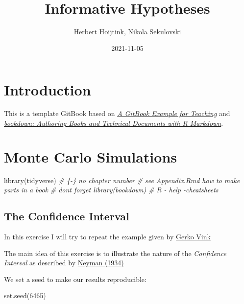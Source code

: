 \documentclass[
]{book}
\title{Informative Hypotheses}
\author{Herbert Hoijtink, Nikola Sekulovski}
\date{2021-11-05}
\newenvironment{Shaded}{\begin{snugshade}}{\end{snugshade}}
\newcommand{\CommentTok}[1]{\textcolor[rgb]{0.56,0.35,0.01}{\textit{#1}}}
\newcommand{\DecValTok}[1]{\textcolor[rgb]{0.00,0.00,0.81}{#1}}
\newcommand{\FunctionTok}[1]{\textcolor[rgb]{0.00,0.00,0.00}{#1}}
\newcommand{\NormalTok}[1]{#1}
\begin{document}
\maketitle

{
\setcounter{tocdepth}{1}
\tableofcontents
}
\hypertarget{introduction}{%
\chapter{Introduction}\label{introduction}}

This is a template GitBook based on \href{https://cjvanlissa.github.io/gitbook-demo/}{\emph{A GitBook Example for Teaching}} and \href{https://bookdown.org/yihui/bookdown/}{\emph{bookdown: Authoring Books and Technical Documents with R Markdown}}.

\hypertarget{monte-carlo-simulations}{%
\chapter{Monte Carlo Simulations}\label{monte-carlo-simulations}}

\begin{Shaded}
\begin{Highlighting}[]
\FunctionTok{library}\NormalTok{(tidyverse)}
\CommentTok{\# \{{-}\} no chapter number}
\CommentTok{\# see Appendix.Rmd how to make parts in a book}
\CommentTok{\# don\textquotesingle{}t forget library(bookdown)}
\CommentTok{\# R {-} help {-}cheatsheets}
\end{Highlighting}
\end{Shaded}

\hypertarget{the-confidence-interval}{%
\section{The Confidence Interval}\label{the-confidence-interval}}

In this exercise I will try to repeat the example given by \href{https://www.gerkovink.com/markup/Wk1/Solution_to_Ex1.html}{Gerko Vink}

The main idea of this exercise is to illustrate the nature of the \emph{Confidence Interval} as described by \href{http://www.stat.cmu.edu/~brian/905-2008/papers/neyman-1934-jrss.pdf}{Neyman (1934)}

We set a seed to make our results reproducible:

\begin{Shaded}
\begin{Highlighting}[]
\FunctionTok{set.seed}\NormalTok{(}\DecValTok{6465}\NormalTok{)}
\end{Highlighting}
\end{Shaded}
\end{document}

